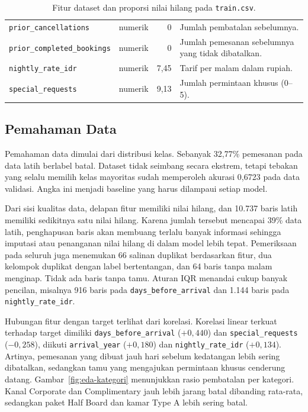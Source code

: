 \begin{table}[htbp]
\begin{tabularx}{\textwidth}{@{}l l r X@{}}
        \texttt{prior\_cancellations} & numerik & 0 & Jumlah pembatalan sebelumnya. \\
        \texttt{prior\_completed\_bookings} & numerik & 0 & Jumlah pemesanan sebelumnya yang tidak dibatalkan. \\
        \texttt{nightly\_rate\_idr} & numerik & 7,45 & Tarif per malam dalam rupiah. \\
        \texttt{special\_requests} & numerik & 9,13 & Jumlah permintaan khusus (0--5). \\
        \bottomrule
    \end{tabularx}
    \caption{Fitur dataset dan proporsi nilai hilang pada \texttt{train.csv}.}
    \label{tab:fitur}
\end{table}

\subsection{Pemahaman Data}\label{sec:eda}
Pemahaman data dimulai dari distribusi kelas. Sebanyak 32,77\% pemesanan pada data latih berlabel batal. Dataset tidak seimbang secara ekstrem, tetapi tebakan yang selalu memilih kelas mayoritas sudah memperoleh akurasi 0,6723 pada data validasi. Angka ini menjadi baseline yang harus dilampaui setiap model.

Dari sisi kualitas data, delapan fitur memiliki nilai hilang, dan 10.737 baris latih memiliki sedikitnya satu nilai hilang. Karena jumlah tersebut mencapai 39\% data latih, penghapusan baris akan membuang terlalu banyak informasi sehingga imputasi atau penanganan nilai hilang di dalam model lebih tepat. Pemeriksaan pada seluruh  juga menemukan 66 salinan duplikat berdasarkan fitur, dua kelompok duplikat dengan label bertentangan, dan 64 baris tanpa malam menginap. Tidak ada baris tanpa tamu. Aturan IQR menandai cukup banyak pencilan, misalnya 916 baris pada \texttt{days\_before\_arrival} dan 1.144 baris pada \texttt{nightly\_rate\_idr}.

Hubungan fitur dengan target terlihat dari korelasi. Korelasi linear terkuat terhadap target dimiliki \texttt{days\_before\_arrival} ($+0{,}440$) dan \texttt{special\_requests} ($-0{,}258$), diikuti \texttt{arrival\_year} ($+0{,}180$) dan \texttt{nightly\_rate\_idr} ($+0{,}134$). Artinya, pemesanan yang dibuat jauh hari sebelum kedatangan lebih sering dibatalkan, sedangkan tamu yang mengajukan permintaan khusus cenderung datang. Gambar~\ref{fig:eda-kategori} menunjukkan rasio pembatalan per kategori. Kanal Corporate dan Complimentary jauh lebih jarang batal dibanding rata-rata, sedangkan paket Half Board dan kamar Type A lebih sering batal.


